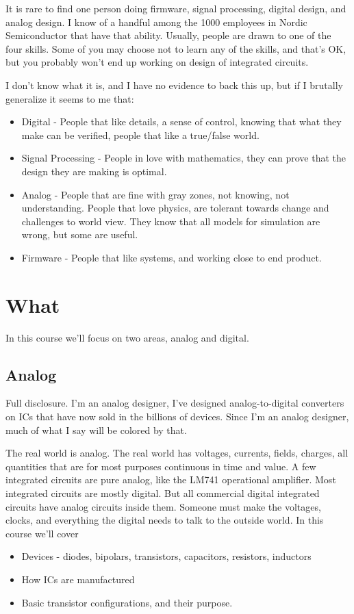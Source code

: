 \documentclass[technote,10pt,a4paper]{IEEEtran}
\begin{document}
It is rare to find one person doing firmware, signal processing, digital design, and analog design.
I know of a handful among the 1000 employees in Nordic Semiconductor that have
that ability. Usually, people are drawn to one of the four skills. Some of you
may choose not to learn any of the skills, and that's OK, but you probably won't
end up working on design of integrated circuits.

I don't know what it is, and I have no evidence to back this up, but if I
brutally generalize it seems to me that:
\begin{itemize}
\item Digital - People that like details, a sense of control, knowing that what
        they make can be verified, people that like a true/false world.
\item Signal Processing - People in love with mathematics, they can prove that the design they are making is optimal.
\item Analog - People that are fine with gray zones, not knowing, not
        understanding. People that love physics, are tolerant towards change and
        challenges to world view. They know that all models for simulation are
        wrong, but some are useful.
\item Firmware - People that like systems, and working close to end product.
\end{itemize}

\section{What}
In this course we'll focus on two areas, analog and digital.

\subsection{Analog}
Full disclosure. I'm an analog designer, I've designed analog-to-digital converters
on ICs that have now sold in the billions of devices. Since I'm an analog designer, much of what I say will be
colored by that.

The real world is analog. The real world has voltages, currents, fields,
charges, all quantities that are for most purposes continuous in time and value.
A few integrated circuits are pure analog, like the LM741 operational
amplifier. Most integrated circuits are mostly digital. But all commercial digital
integrated circuits have analog circuits inside them. Someone must make the
voltages, clocks, and everything the digital needs to talk to the outside world.
In this course we'll cover
\begin{itemize}
  \item Devices - diodes, bipolars, transistors, capacitors, resistors,
        inductors
  \item How ICs are manufactured
  \item Basic transistor configurations, and their purpose.
\end{itemize}
\end{document}
